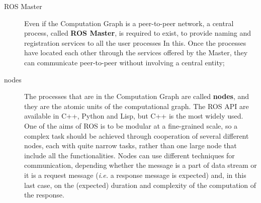 \begin{description}
\item[ROS Master] Even if the Computation Graph is a peer-to-peer network, a central process, called  \textbf{\ac{ROS} Master}, is required to exist, to provide naming and registration services to all the user processes In this. Once the processes have located each other through the services offered by the Master, they can communicate peer-to-peer without involving a central entity;

\item[nodes] The processes that are in the Computation Graph are called \textbf{nodes}, and they are the atomic units of the computational graph. The \ac{ROS} \ac{API} are available in C++, Python and Lisp, but C++ is the most widely used. One of the aims of \ac{ROS} is to be modular at a fine-grained scale, so a complex task should be achieved through cooperation of several different nodes, each with quite narrow tasks, rather than one large node that include all the functionalities. Nodes can use different techniques for communication, depending whether the message is a part of data stream or it is a request message (\textit{i.e.} a response message is expected) and, in this last case, on the (expected) duration and complexity of the computation of the response.


\begin{figure}
	\centering
	\qquad
		

\end{figure}
\end{description}
